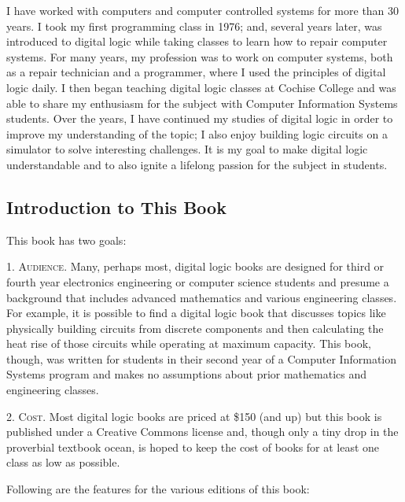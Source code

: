I have worked with computers and computer controlled systems for more than 30 years. I took my first programming class in 1976; and, several years later, was introduced to digital logic while taking classes to learn how to repair computer systems. For many years, my profession was to work on computer systems, both as a repair technician and a programmer, where I used the principles of digital logic daily. I then began teaching digital logic classes at Cochise College and was able to share my enthusiasm for the subject with Computer Information Systems students. Over the years, I have continued my studies of digital logic in order to improve my understanding of the topic; I also enjoy building logic circuits on a simulator to solve interesting challenges. It is my goal to make digital logic understandable and to also ignite a lifelong passion for the subject in students.

\subsection{Introduction to This Book}

This book has two goals:

1. \textsc{Audience}. Many, perhaps most, digital logic books are designed for third or fourth year electronics engineering or computer science students and presume a background that includes advanced mathematics and various engineering classes. For example, it is possible to find a digital logic book that discusses topics like physically building circuits from discrete components and then calculating the heat rise of those circuits while operating at maximum capacity. This book, though, was written for students in their second year of a Computer Information Systems program and makes no assumptions about prior mathematics and engineering classes.

2. \textsc{Cost}. Most digital logic books are priced at \$150 (and up) but this book is published under a Creative Commons license and, though only a tiny drop in the proverbial textbook ocean, is hoped to keep the cost of books for at least one class as low as possible.

Following are the features for the various editions of this book:

